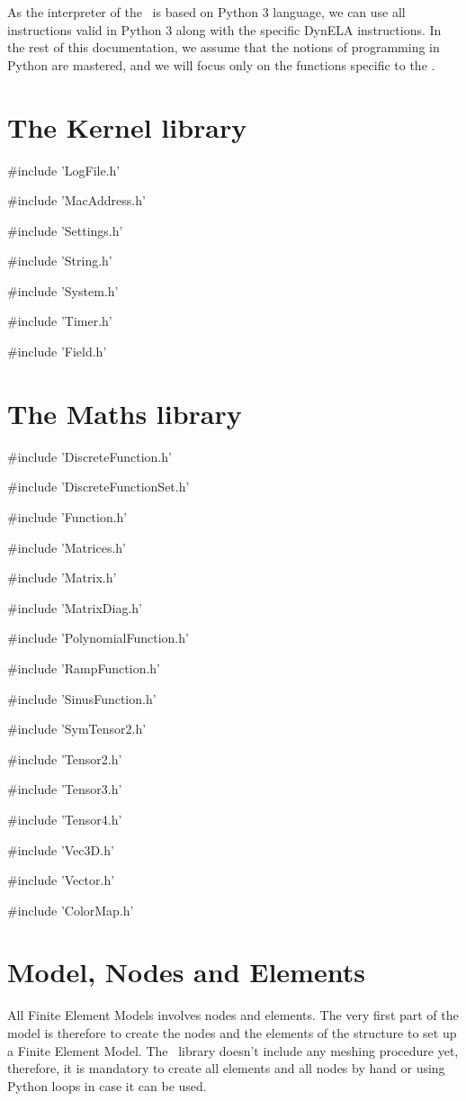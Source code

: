 As the interpreter of the \DynELA~is based on Python 3 language, we can use all instructions valid in Python 3 along with the specific DynELA instructions. In the rest of this documentation, we assume that the notions of programming in Python are mastered, and we will focus only on the functions specific to the \DynELA.

\section{The Kernel library}

\#include 'LogFile.h'

\#include 'MacAddress.h'

\#include 'Settings.h'

\#include 'String.h'

\#include 'System.h'

\#include 'Timer.h'

\#include 'Field.h'

\section{The Maths library}

\#include 'DiscreteFunction.h'

\#include 'DiscreteFunctionSet.h'

\#include 'Function.h'

\#include 'Matrices.h'

\#include 'Matrix.h'

\#include 'MatrixDiag.h'

\#include 'PolynomialFunction.h'

\#include 'RampFunction.h'

\#include 'SinusFunction.h'

\#include 'SymTensor2.h'

\#include 'Tensor2.h'

\#include 'Tensor3.h'

\#include 'Tensor4.h'

\#include 'Vec3D.h'

\#include 'Vector.h'

\#include 'ColorMap.h'

\section{Model, Nodes and Elements}

All Finite Element Models involves nodes and elements. The very first part of the model is therefore to create the nodes and the elements of the structure to set up a Finite Element Model. The \DynELA~library doesn't include any meshing procedure yet, therefore, it is mandatory to create all elements and all nodes by hand or using Python loops in case it can be used.


